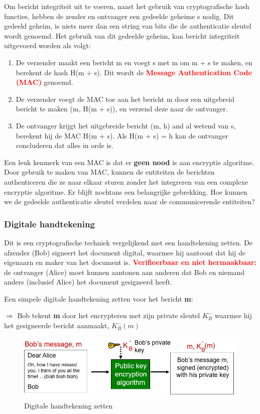 Om bericht integriteit uit te voeren, naast het gebruik van cryptografische hash functies, hebben de zender en ontvanger een gedeelde geheime s nodig. Dit gedeeld geheim, is niets meer dan een string van bits die de authenticatie sleutel wordt genoemd. Het gebruik van dit gedeelde geheim, kan bericht integriteit uitgevoerd worden als volgt:
\begin{enumerate}
    \item De verzender maakt een bericht m en voegt s met m om m + s te maken, en berekent de hash H(m + s). Dit wordt de \textcolor{red}{\textbf{Message Authentication Code (MAC)}} genoemd.
    \item De verzender voegt de MAC toe aan het bericht m door een uitgebreid bericht te maken (m, H(m + s)), en verzend deze naar de ontvanger.
    \item De ontvanger krijgt het uitgebreide bericht (m, h) and al wetend van s, berekent hij de MAC H(m + s). Als H(m + s) = h kan de ontvanger concluderen dat alles in orde is.
\end{enumerate}
Een leuk kenmerk van een MAC is dat er \textbf{geen nood} is aan encryptie algoritme. Door gebruik te maken van MAC, kunnen de entiteiten de berichten authenticeren die ze naar elkaar sturen zonder het integreren van een complexe encryptie algoritme.
Er blijft nochtans een belangrijke gebrekking. Hoe kunnen we de gedeelde authenticatie sleutel verdelen naar de communicerende entiteiten?

\clearpage

\subsubsection{Digitale handtekening}

Dit is een cryptografische techniek vergelijkend met een handtekening zetten.
\bi
\itf De afzender (Bob) signeert het document digital, waarmee hij aantoont dat hij de eigenaarn en maker van het document is. 
\itf \textcolor{red}{\textbf{Verifieerbaar en niet hermaakbaar:}} de ontvanger (Alice) moet kunnen aantonen aan anderen dat Bob en niemand anders (inclusief Alice) het document gesigneerd heeft.
\ei

\noindent Een simpele digitale handtekening zetten voor het bericht \textbf{m}:

\noindent $\Rightarrow$ Bob tekent \textbf{m} door het encrypteren met zijn private sleutel $K^-_B$ waarmee hij het gesigneerde bericht aanmaakt, $K^-_B (m)$


\begin{figure}[h]
    \centering
    \includegraphics[width=7in]{./img/imghfdst8/hfdst8puntje7.png}
    \caption{Digitale handtekening zetten }      
    \label{fig:Digitale handtekening zetten  }
\end{figure}

